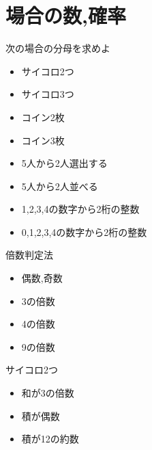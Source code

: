 \documentclass[10pt]{jsarticle}
\begin{document}
\section{場合の数,確率}
\begin{itembox}[l]{次の場合の分母を求めよ}
	\begin{multicols}{2}
		\begin{itemize}
			\item サイコロ2つ\vspace{5mm}
			\item サイコロ3つ\vspace{5mm}
			\item コイン2枚\vspace{5mm}
			\item コイン3枚\vspace{5mm}
			\item 5人から2人選出する\vspace{5mm}
			\item 5人から2人並べる\vspace{5mm}
			\item 1,2,3,4の数字から2桁の整数\vspace{5mm}
			\item 0,1,2,3,4の数字から2桁の整数\vspace{5mm}
		\end{itemize}
	\end{multicols}

\end{itembox}
\begin{itembox}[l]{倍数判定法}
	\begin{multicols}{2}
		\begin{itemize}
			\item 偶数,奇数\vspace{5mm}
			\item 3の倍数\vspace{5mm}
			\item 4の倍数\vspace{5mm}
			\item 9の倍数
		\end{itemize}
	\end{multicols}
\end{itembox}

\begin{itembox}[l]{サイコロ2つ}
	\begin{multicols}{2}
		\begin{itemize}
			\item 和が3の倍数\vspace{5mm}
			\item 積が偶数\vspace{5mm}
			\item 積が12の約数\vspace{5mm}
		\end{itemize}
	\end{multicols}
\end{itembox}
\end{document}
